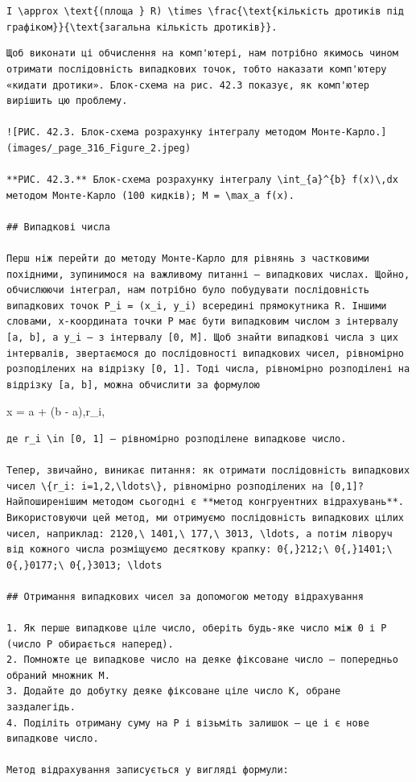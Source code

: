 \documentclass[
  ukrainian,
]{article}
\begin{document}
\texttt{I\ \textbackslash{}approx\ \textbackslash{}text\{(площа\ \}\ R)\ \textbackslash{}times\ \textbackslash{}frac\{\textbackslash{}text\{кількість\ дротиків\ під\ графіком\}\}\{\textbackslash{}text\{загальна\ кількість\ дротиків\}\}.}

\begin{verbatim}
Щоб виконати ці обчислення на комп'ютері, нам потрібно якимось чином отримати послідовність випадкових точок, тобто наказати комп'ютеру «кидати дротики». Блок-схема на рис. 42.3 показує, як комп'ютер вирішить цю проблему.

![РИС. 42.3. Блок-схема розрахунку інтегралу методом Монте-Карло.](images/_page_316_Figure_2.jpeg)

**РИС. 42.3.** Блок-схема розрахунку інтегралу \int_{a}^{b} f(x)\,dx методом Монте-Карло (100 кидків); M = \max_a f(x).

## Випадкові числа

Перш ніж перейти до методу Монте-Карло для рівнянь з частковими похідними, зупинимося на важливому питанні — випадкових числах. Щойно, обчислюючи інтеграл, нам потрібно було побудувати послідовність випадкових точок P_i = (x_i, y_i) всередині прямокутника R. Іншими словами, x-координата точки P має бути випадковим числом з інтервалу [a, b], а y_i — з інтервалу [0, M]. Щоб знайти випадкові числа з цих інтервалів, звертаємося до послідовності випадкових чисел, рівномірно розподілених на відрізку [0, 1]. Тоді числа, рівномірно розподілені на відрізку [a, b], можна обчислити за формулою
\end{verbatim}

x = a + (b - a),r\_i,

\begin{verbatim}
де r_i \in [0, 1] — рівномірно розподілене випадкове число.

Тепер, звичайно, виникає питання: як отримати послідовність випадкових чисел \{r_i: i=1,2,\ldots\}, рівномірно розподілених на [0,1]? Найпоширенішим методом сьогодні є **метод конгруентних відрахувань**. Використовуючи цей метод, ми отримуємо послідовність випадкових цілих чисел, наприклад: 2120,\ 1401,\ 177,\ 3013, \ldots, а потім ліворуч від кожного числа розміщуємо десяткову крапку: 0{,}212;\ 0{,}1401;\ 0{,}0177;\ 0{,}3013; \ldots

## Отримання випадкових чисел за допомогою методу відрахування

1. Як перше випадкове ціле число, оберіть будь-яке число між 0 і P (число P обирається наперед).
2. Помножте це випадкове число на деяке фіксоване число — попередньо обраний множник M.
3. Додайте до добутку деяке фіксоване ціле число K, обране заздалегідь.
4. Поділіть отриману суму на P і візьміть залишок — це і є нове випадкове число.

Метод відрахування записується у вигляді формули:
\end{verbatim}
\end{document}
